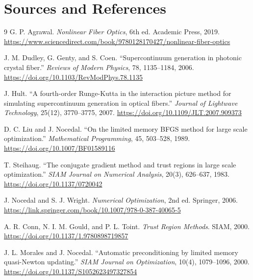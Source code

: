 \documentclass[11pt]{article}
\begin{document}
\section{Sources and References}

\begin{thebibliography}{9}
G. P. Agrawal. \textit{Nonlinear Fiber Optics}, 6th ed. Academic Press, 2019.
\url{https://www.sciencedirect.com/book/9780128170427/nonlinear-fiber-optics}

J. M. Dudley, G. Genty, and S. Coen. ``Supercontinuum generation in photonic
crystal fiber.'' \textit{Reviews of Modern Physics}, 78, 1135--1184, 2006.
\url{https://doi.org/10.1103/RevModPhys.78.1135}

J. Hult. ``A fourth-order Runge-Kutta in the interaction picture method for
simulating supercontinuum generation in optical fibers.'' \textit{Journal of
Lightwave Technology}, 25(12), 3770--3775, 2007.
\url{https://doi.org/10.1109/JLT.2007.909373}

D. C. Liu and J. Nocedal. ``On the limited memory BFGS method for large scale
optimization.'' \textit{Mathematical Programming}, 45, 503--528, 1989.
\url{https://doi.org/10.1007/BF01589116}

T. Steihaug. ``The conjugate gradient method and trust regions in large scale
optimization.'' \textit{SIAM Journal on Numerical Analysis}, 20(3), 626--637,
1983. \url{https://doi.org/10.1137/0720042}

J. Nocedal and S. J. Wright. \textit{Numerical Optimization}, 2nd ed.
Springer, 2006. \url{https://link.springer.com/book/10.1007/978-0-387-40065-5}

A. R. Conn, N. I. M. Gould, and P. L. Toint. \textit{Trust Region Methods}.
SIAM, 2000. \url{https://doi.org/10.1137/1.9780898719857}

J. L. Morales and J. Nocedal. ``Automatic preconditioning by limited memory
quasi-Newton updating.'' \textit{SIAM Journal on Optimization}, 10(4),
1079--1096, 2000. \url{https://doi.org/10.1137/S1052623497327854}
\end{thebibliography}
\end{document}
